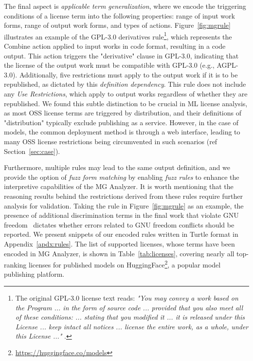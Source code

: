The final aspect is \emph{applicable term generalization}, where we encode the triggering conditions of a license term into the following properties: range of input work forms, range of output work forms, and types of actions.
Figure~\ref{fig:mgrule} illustrates an example of the GPL-3.0 derivatives rule\footnote{The original GPL-3.0 license text reads: \emph{"You may convey a work based on the Program ... in the form of source code ... provided that you also meet all of these conditions: ... stating that you modified it ... it is released under this License ... keep intact all notices ... license the entire work, as a whole, under this License ..."} .}, which represents the Combine action applied to input works in code format, resulting in a code output.
This action triggers the "derivative" clause in GPL-3.0, indicating that the license of the output work must be compatible with GPL-3.0 (e.g., AGPL-3.0). Additionally, five restrictions must apply to the output work if it is to be republished, as dictated by this \emph{definition dependency}.
This rule does not include any \emph{Use Restrictions}, which apply to output works regardless of whether they are republished. 
We found this subtle distinction to be crucial in ML license analysis, as most OSS license terms are triggered by distribution, and their definitions of "distribution" typically exclude publishing as a service. 
However, in the case of models, the common deployment method is through a web interface,  leading to many OSS license restrictions being circumvented in such scenarios (ref Section~\ref{sec:case}).

Furthermore, multiple rules may lead to the same output definition, and we provide the option of \emph{fuzz form matching} by enabling \emph{fuzz rules} to enhance the interpretive capabilities of the MG Analyzer.
It is worth mentioning that the reasoning results behind the restrictions derived from these rules require further analysis for validation.
Taking the rule in Figure~\ref{fig:mgrule} as an example,  the presence of additional discrimination terms in the final work that violate GNU freedom~\cite{greenbaum2016the} dictates whether errors related to GNU freedom conflicts should be reported.
We present snippets of our encoded rules written in Turtle format in Appendix~\ref{apdx:rules}.
The list of supported licenses, whose terms have been encoded in MG Analyzer, is shown in Table~\ref{tab:licenses}, covering nearly all top-ranking licenses for published models on HuggingFace\footnote{\url{https://huggingface.co/models}}, a popular model publishing platform.

